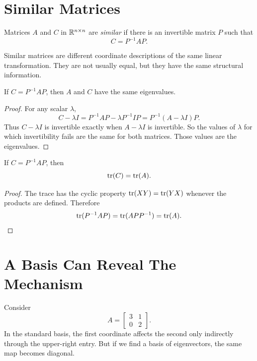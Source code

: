 \section{Similar Matrices}

\begin{definition}[Similarity]
Matrices $A$ and $C$ in $\mathbb{R}^{n\times n}$ are \emph{similar} if there is an
invertible matrix $P$ such that
\[
  C=P^{-1}AP.
\]
\end{definition}

Similar matrices are different coordinate descriptions of the same linear
transformation. They are not usually equal, but they have the same structural
information.

\begin{proposition}
If $C=P^{-1}AP$, then $A$ and $C$ have the same eigenvalues.
\end{proposition}

\begin{proof}
For any scalar $\lambda$,
\[
  C-\lambda I
  =
  P^{-1}AP-\lambda P^{-1}IP
  =
  P^{-1}(A-\lambda I)P.
\]
Thus $C-\lambda I$ is invertible exactly when $A-\lambda I$ is invertible.
So the values of $\lambda$ for which invertibility fails are the same for both
matrices. Those values are the eigenvalues.
\end{proof}

\begin{proposition}
If $C=P^{-1}AP$, then
\[
  \operatorname{tr}(C)=\operatorname{tr}(A).
\]
\end{proposition}

\begin{proof}
The trace has the cyclic property $\operatorname{tr}(XY)=\operatorname{tr}(YX)$ whenever the products
are defined. Therefore
\[
  \operatorname{tr}(P^{-1}AP)
  =
  \operatorname{tr}(APP^{-1})
  =
  \operatorname{tr}(A).
\]
\end{proof}

\section{A Basis Can Reveal The Mechanism}

Consider
\[
  A=
  \begin{bmatrix}
  3&1\\
  0&2
  \end{bmatrix}.
\]
In the standard basis, the first coordinate affects the second only indirectly
through the upper-right entry. But if we find a basis of eigenvectors, the same
map becomes diagonal.

